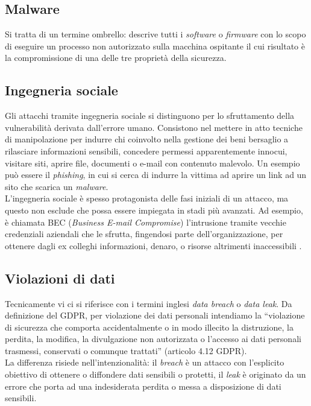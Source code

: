 \documentclass[12pt,a4paper,twoside]{report}
\begin{document}
\subsection{Malware}
Si tratta di un termine ombrello: descrive tutti i \textit{software} o \textit{firmware} con lo scopo di eseguire un processo non autorizzato sulla macchina ospitante il cui risultato \`e la compromissione di una delle tre propriet\`a della sicurezza.\\

\subsection{Ingegneria sociale}
Gli attacchi tramite ingegneria sociale si distinguono per lo sfruttamento della vulnerabilit\`a derivata dall'errore umano. Consistono nel mettere in atto tecniche di manipolazione per indurre chi coinvolto nella gestione dei beni bersaglio a rilasciare informazioni sensibili, concedere permessi 
apparentemente innocui, visitare siti, aprire file, documenti o e-mail con contenuto malevolo. Un esempio pu\`o essere il \textit{phishing}, in cui si cerca di indurre la vittima ad aprire un link ad un sito che scarica un \textit{malware}.\\
L'ingegneria sociale \`e spesso protagonista delle fasi iniziali di un attacco, ma questo non esclude che possa essere impiegata in stadi pi\`u avanzati. Ad esempio, \`e chiamata BEC (\textit{Business E-mail Compromise}) l'intrusione tramite vecchie credenziali aziendali che le sfrutta, fingendosi parte dell'organizzazione, per ottenere dagli ex colleghi informazioni, denaro, o risorse altrimenti inaccessibili \cite{IBM_BEC}.\\

\subsection{Violazioni di dati}
Tecnicamente vi ci si riferisce con i termini inglesi \textit{data breach} o \textit{data leak}.  
Da definizione del GDPR, per violazione dei dati personali intendiamo la ``violazione di sicurezza che comporta accidentalmente o in modo illecito la distruzione, la perdita, la modifica, la divulgazione non autorizzata o l'accesso ai dati personali trasmessi, conservati o comunque trattati'' (articolo 4.12 GDPR). \\
La differenza risiede nell'intenzionalità: il \textit{breach} \`e un attacco con l'esplicito obiettivo di ottenere o diffondere dati sensibili o protetti, il \textit{leak} è originato da un errore che porta ad una indesiderata perdita o messa a disposizione di dati sensibili. \\
\end{document}
